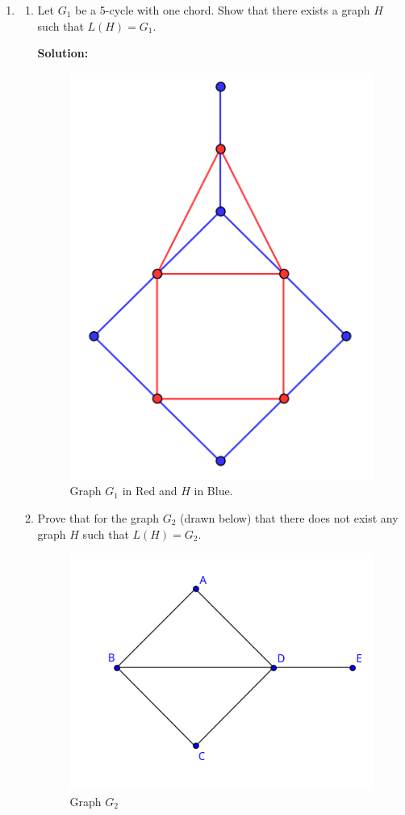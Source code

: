 \documentclass[12pt]{article}
\newcommand{\localhead}[1]{\par\smallskip\textbf{#1}\nobreak\\}%
\newcommand\solution{\localhead{Solution:}}
\begin{document}
\begin{enumerate}
\begin{enumerate}
\begin{proof}
	\end{proof}
	\end{enumerate}
	\newpage










	\item
	\begin{enumerate}
	\item Let $G_1$ be a 5-cycle with one chord. Show that there exists a graph $H$ such that $L(H)=G_1.$
	\solution
	\begin{figure}[H]
		\begin{center}
			\caption{Graph $G_1$ in Red and $H$ in Blue.}
			\includegraphics[width=.35\textwidth]{CycleGraph.png}
		\end{center}
	\end{figure}


	\item Prove that for the graph $G_2$ (drawn below) that there does not exist any graph $H$ such that $L(H)=G_2.$\\
	\begin{figure}[H]
		\begin{center}
			\caption{Graph $G_2$}
			\includegraphics[width=.35\textwidth]{ClawGraph.png}
		\end{center}
	\end{figure}



\end{enumerate}
\end{enumerate}
\end{document}
